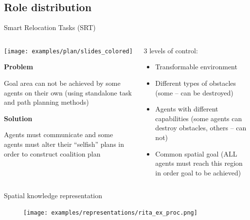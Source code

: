 \documentclass[default]{beamer}
\begin{document}
	\subsection{Role distribution}
	\begin{frame}{Smart Relocation Tasks (SRT)}
		
		\begin{columns}
			\small
			\begin{column}{0.6\textwidth}
				\begin{center}
					\texttt{[image: examples/plan/slides\_colored]}
				\end{center}
				
				\textbf{Problem}
				
				Goal area can not be achieved by some agents on their own (using standalone task and path planning methods)
				
				\textbf{Solution}
				
				Agents must communicate and some agents must alter their ``selfish'' plans in order to construct coalition plan
				
			\end{column}
			\begin{column}{0.4\textwidth}
				3 levels of control:
				\begin{itemize}
					\item Transformable environment
					\item Different types of obstacles (some -- can be destroyed)
					\item Agents with different capabilities (some agents can destroy obstacles, others -- can not)
					\item Common spatial goal (ALL agents must reach this region in order goal to be achieved)
				\end{itemize}
			\end{column}
		\end{columns}
		\vspace{-5pt}
		\nocite{*}
		\printbibliography[keyword={srt}, resetnumbers=true]
		\end{frame}
		
		\begin{frame}{Spatial knowledge representation}
		
			\begin{figure}
			\texttt{[image: examples/representations/rita\_ex\_proc.png]}
			\end{figure}
		\end{frame}
		
\end{document}
